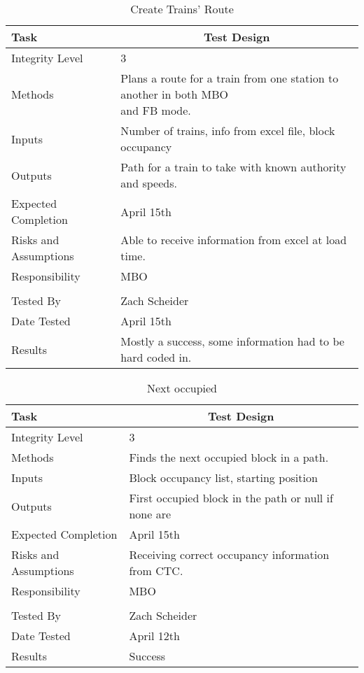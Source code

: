 \documentclass[]{article}
\begin{document}
\begin{table}[H]
	\centering
	\caption{Create Trains' Route}
	\begin{tabular}{|l|l|}
		\hline
		Task & \multicolumn{1}{c|}{Test Design} \\ \hline
		Integrity Level & 3 \\ \hline
		Methods & \parbox[t]{10cm}{Plans a route for a train from one station to another in both MBO \\and FB mode.} \\ \hline
		Inputs &  Number of trains, info from excel file, block occupancy \\ \hline
		Outputs &  Path for a train to take with known authority and speeds. \\ \hline
		Expected Completion & \parbox[t]{10cm}{April 15th}\\ \hline
		Risks and Assumptions & \parbox[t]{10cm}{Able to receive information from excel at load time.} \\ \hline
		Responsibility & MBO\\ \hline
			\\ \hline
		Tested By   &  Zach Scheider\\	\hline
		Date Tested & \parbox[t]{10cm}{April 15th}\\ \hline
		Results & Mostly a success, some information had to be hard coded in.\\ \hline
	\end{tabular}
\end{table}

\begin{table}[H]
	\centering
	\caption{Next occupied}
	\begin{tabular}{|l|l|}
		\hline
		Task & \multicolumn{1}{c|}{Test Design} \\ \hline
		Integrity Level & 3 \\ \hline
		Methods & Finds the next occupied block in a path. \\ \hline
		Inputs &  Block occupancy list, starting position\\ \hline
		Outputs &  First occupied block in the path or null if none are \\ \hline
		Expected Completion & \parbox[t]{10cm}{April 15th}\\ \hline
		Risks and Assumptions & \parbox[t]{10cm}{Receiving correct occupancy information from CTC.} \\ \hline
		Responsibility & MBO\\ \hline
			\\ \hline
		Tested By   &  Zach Scheider\\	\hline
		Date Tested & \parbox[t]{10cm}{April 12th}\\ \hline
		Results & Success\\ \hline
	\end{tabular}
\end{table}
\end{document}
